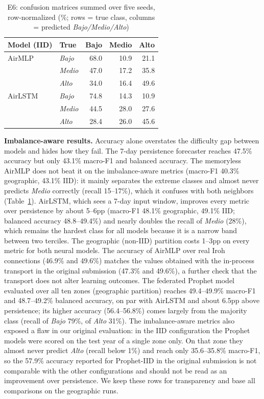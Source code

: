 \documentclass[a4paper,fleqn]{cas-dc}
\begin{document}
\begin{table}[t]
\centering
\caption{E6: confusion matrices summed over five seeds, row-normalized (\%; rows = true class, columns = predicted \textit{Bajo/Medio/Alto})}
\label{tab:e6cm}
\scriptsize
\setlength{\tabcolsep}{3pt}
\begin{tabular}{@{}l l r r r@{}}
\toprule
\textbf{Model (IID)} & \textbf{True} & \textbf{Bajo} & \textbf{Medio} & \textbf{Alto} \\
\midrule
AirMLP  & \textit{Bajo}  & 68.0 & 10.9 & 21.1 \\
        & \textit{Medio} & 47.0 & 17.2 & 35.8 \\
        & \textit{Alto}  & 34.0 & 16.4 & 49.6 \\
\midrule
AirLSTM & \textit{Bajo}  & 74.8 & 14.3 & 10.9 \\
        & \textit{Medio} & 44.5 & 28.0 & 27.6 \\
        & \textit{Alto}  & 28.4 & 26.0 & 45.6 \\
\bottomrule
\end{tabular}
\end{table}

\textbf{Imbalance-aware results.} Accuracy alone overstates the difficulty gap between models and hides how they fail. The 7-day persistence forecaster reaches 47.5\% accuracy but only 43.1\% macro-F1 and balanced accuracy. The memoryless AirMLP does not beat it on the imbalance-aware metrics (macro-F1 40.3\% geographic, 43.1\% IID): it mainly separates the extreme classes and almost never predicts \textit{Medio} correctly (recall 15--17\%), which it confuses with both neighbors (Table~\ref{tab:e6cm}). AirLSTM, which sees a 7-day input window, improves every metric over persistence by about 5--6pp (macro-F1 48.1\% geographic, 49.1\% IID; balanced accuracy 48.8--49.4\%) and nearly doubles the recall of \textit{Medio} (28\%), which remains the hardest class for all models because it is a narrow band between two terciles. The geographic (non-IID) partition costs 1--3pp on every metric for both neural models. The accuracy of AirMLP over real Iroh connections (46.9\% and 49.6\%) matches the values obtained with the in-process transport in the original submission (47.3\% and 49.6\%), a further check that the transport does not alter learning outcomes. The federated Prophet model evaluated over all ten zones (geographic partition) reaches 49.4--49.9\% macro-F1 and 48.7--49.2\% balanced accuracy, on par with AirLSTM and about 6.5pp above persistence; its higher accuracy (56.4--56.8\%) comes largely from the majority class (recall of \textit{Bajo} 79\%, of \textit{Alto} 31\%). The imbalance-aware metrics also exposed a flaw in our original evaluation: in the IID configuration the Prophet models were scored on the test year of a single zone only. On that zone they almost never predict \textit{Alto} (recall below 1\%) and reach only 35.6--35.8\% macro-F1, so the 57.9\% accuracy reported for Prophet-IID in the original submission is not comparable with the other configurations and should not be read as an improvement over persistence. We keep these rows for transparency and base all comparisons on the geographic runs.
\end{document}
